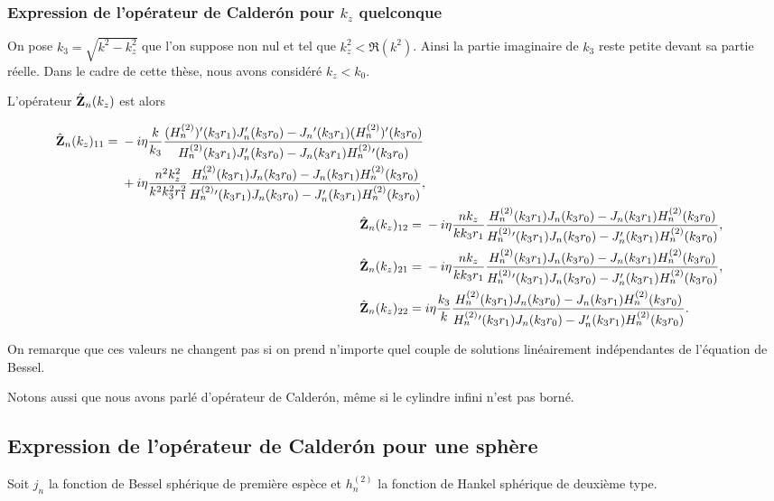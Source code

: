     \subsubsection{Expression de l'opérateur de Calderón pour \(k_z\) quelconque}

      On pose \(k_3 = \sqrt{k^2 - k_z^2}\) que l'on suppose non nul et tel que \(k_z^2 < \Re(k^2)\).
      Ainsi la partie imaginaire de \(k_3\) reste petite devant sa partie réelle.
      Dans le cadre de cette thèse, nous avons considéré \(k_z < k_0\).

      L'opérateur \(\hat{\mathbf{Z}}_n(k_z)\) est alors

      \newcommand{\Sni}{\frac{
        (H^{(2)}_n{})'(k_3r_1)J_n'(k_3r_0)-J_n{}'(k_3r_1)(H^{(2)}_n{})'(k_3r_0)
      }{
        H^{(2)}_n(k_3r_1)J_n'(k_3r_0)-J_n(k_3r_1)H^{(2)}_n{}'(k_3r_0)
      }}

      \newcommand{\Tni}{\frac{
        H^{(2)}_n(k_3r_1)J_n(k_3r_0)-J_n(k_3r_1)H^{(2)}_n(k_3r_0)
      }{
        H^{(2)}_n{}'(k_3r_1)J_n(k_3r_0)-J_n'(k_3r_1)H^{(2)}_n(k_3r_0)
      }}

      \begin{align*}
        \begin{split}
          \hat\mZ_n(k_z)_{11} ={}& - i\eta\frac{k}{k_3}\Sni
          \\
          {}& + i\eta\frac{n^2k_z^2}{k^2k_3^2r_1^2}\Tni,
        \end{split}
        \\
        \hat\mZ_n(k_z)_{12} ={}& -i\eta\frac{nk_z}{kk_3r_1}\Tni,
        \\
        \hat\mZ_n(k_z)_{21} ={}& -i\eta\frac{nk_z}{kk_3r_1}\Tni,
        \\
        \hat\mZ_n(k_z)_{22} ={}& i\eta\frac{k_3}{k}\Tni.
      \end{align*}

      On remarque que ces valeurs ne changent pas si on prend n'importe quel couple de solutions linéairement indépendantes de l'équation de Bessel.

      Notons aussi que nous avons parlé d'opérateur de Calderón, même si le cylindre infini n'est pas borné.

  \subsection{Expression de l'opérateur de Calderón pour une sphère}

    Soit \(j_n\) la fonction de Bessel sphérique de première espèce et \(h_n^{(2)}\) la fonction de Hankel sphérique de deuxième type.

